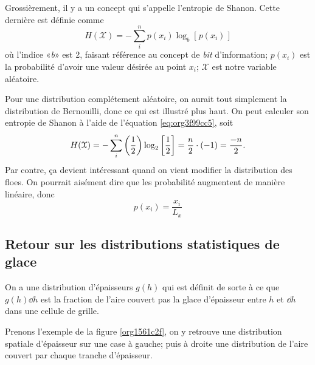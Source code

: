 \documentclass[10pt]{article}
\numberwithin{equation}{section}
\newcommand{\pt}{\hspace{1pt}} %
\begin{document}
Grossièrement, il y a un concept qui s'appelle l'entropie de Shanon.
Cette dernière est définie comme
\begin{equation}
\label{eq:org3f99cc5}
   H(\mathcal{X}) = -\sum_i^n p(x_i) \log_b[\pt p(x_i)\pt]
\end{equation}
où l'indice «\textit{b}» est 2, faisant référence au concept de \emph{bit} d'information; \(p(x_i)\) est la probabilité d'avoir une valeur désirée au point \(x_i\); \(\mathcal{X}\) est notre variable aléatoire.\bigskip

Pour une distribution complétement aléatoire, on aurait tout simplement la distribution de Bernouilli, donc ce qui est illustré plus haut.
On peut calculer son entropie de Shanon à l'aide de l'équation \ref{eq:org3f99cc5}, soit
\begin{equation}
   H(\mathcal{X}) = -\sum_i^n \qty(\frac{1}{2}) \log_2\qty[\frac{1}{2}] = \frac{n}{2}\cdot (-1) = \frac{-n}{2}.
\end{equation}
Par contre, ça devient intéressant quand on vient modifier la distribution des floes.
On pourrait aisément dire que les probabilité augmentent de manière linéaire, donc
\begin{equation}
   p(x_i) = \frac{x_i}{L_x}
\end{equation}
\subsection{Retour sur les distributions statistiques de glace}
\label{sec:orgb40faa4}

On a une distribution d'épaisseurs \(g(h)\) qui est définit de sorte à ce que \(g(h)\dd h\) est la
fraction de l'aire couvert pas la glace d'épaisseur entre \(h\) et \(\dd h\) dans une cellule de grille.\bigskip

Prenons l'exemple de la figure \ref{org1561c2f}, on y retrouve une distribution spatiale d'épaisseur sur une case à gauche; puis à droite une distribution de l'aire couvert par chaque tranche d'épaisseur.
\end{document}
